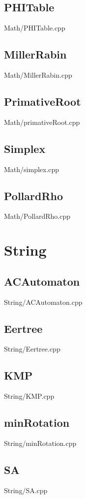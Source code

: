     \subsection{PHITable}
         {Math/PHITable.cpp}
    \subsection{MillerRabin}
         {Math/MillerRabin.cpp}
    \subsection{PrimativeRoot}
         {Math/primativeRoot.cpp}
    \subsection{Simplex}
         {Math/simplex.cpp}
    \subsection{PollardRho}
         {Math/PollardRho.cpp}

\section{String}
    \subsection{ACAutomaton}
         {String/ACAutomaton.cpp}
    \subsection{Eertree}
         {String/Eertree.cpp}
    \subsection{KMP}
         {String/KMP.cpp}
    \subsection{minRotation}
         {String/minRotation.cpp}
    \subsection{SA}
         {String/SA.cpp}

